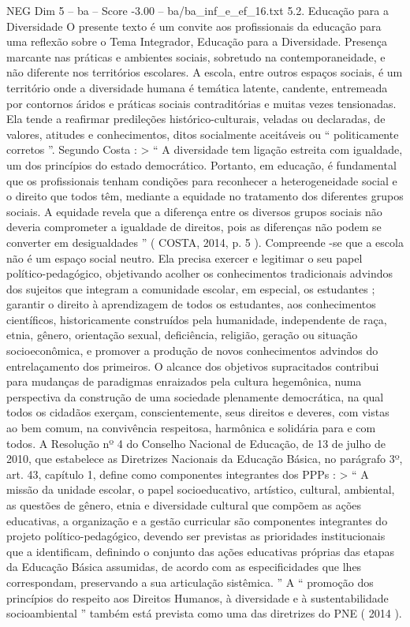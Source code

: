 \begin{textsample}{NEG Dim 5 – ba – Score -3.00 – ba/ba\_inf\_e\_ef\_16.txt}  \label{ex:f5_neg_007}
5.2.
Educação para a Diversidade O presente texto é um convite aos profissionais da educação para uma reflexão sobre o Tema Integrador, Educação para a Diversidade.
Presença marcante nas práticas e ambientes sociais, sobretudo na contemporaneidade, e não diferente nos territórios escolares.
A escola, entre outros espaços sociais, é um território onde a diversidade humana é temática latente, candente, entremeada por contornos áridos e práticas sociais contraditórias e muitas vezes tensionadas.
Ela tende a reafirmar predileções histórico-culturais, veladas ou declaradas, de valores, atitudes e conhecimentos, ditos socialmente aceitáveis ou “ politicamente corretos ”.
Segundo Costa : > “ A diversidade tem ligação estreita com igualdade, um dos princípios do estado democrático.
Portanto, em educação, é fundamental que os profissionais tenham condições para reconhecer a heterogeneidade social e o direito que todos têm, mediante a equidade no tratamento dos diferentes grupos sociais.
A equidade revela que a diferença entre os diversos grupos sociais não deveria comprometer a igualdade de direitos, pois as diferenças não podem se converter em desigualdades ” ( COSTA, 2014, p. 5 ).
Compreende -se que a escola não é um espaço social neutro.
Ela precisa exercer e legitimar o seu papel político-pedagógico, objetivando acolher os conhecimentos tradicionais advindos dos sujeitos que integram a comunidade escolar, em especial, os estudantes ; garantir o direito à aprendizagem de todos os estudantes, aos conhecimentos científicos, historicamente construídos pela humanidade, independente de raça, etnia, gênero, orientação sexual, deficiência, religião, geração ou situação socioeconômica, e promover a produção de novos conhecimentos advindos do entrelaçamento dos primeiros.
O alcance dos objetivos supracitados contribui para mudanças de paradigmas enraizados pela cultura hegemônica, numa perspectiva da construção de uma sociedade plenamente democrática, na qual todos os cidadãos exerçam, conscientemente, seus direitos e deveres, com vistas ao bem comum, na convivência respeitosa, harmônica e solidária para e com todos.
A Resolução nº 4 do Conselho Nacional de Educação, de 13 de julho de 2010, que estabelece as Diretrizes Nacionais da Educação Básica, no parágrafo 3º, art. 43, capítulo 1, define como componentes integrantes dos PPPs : > “ A missão da unidade escolar, o papel socioeducativo, artístico, cultural, ambiental, as questões de gênero, etnia e diversidade cultural que compõem as ações educativas, a organização e a gestão curricular são componentes integrantes do projeto político-pedagógico, devendo ser previstas as prioridades institucionais que a identificam, definindo o conjunto das ações educativas próprias das etapas da Educação Básica assumidas, de acordo com as especificidades que lhes correspondam, preservando a sua articulação sistêmica. ” A “ promoção dos princípios do respeito aos Direitos Humanos, à diversidade e à sustentabilidade socioambiental ” também está prevista como uma das diretrizes do PNE ( 2014 ).

\end{textsample}
